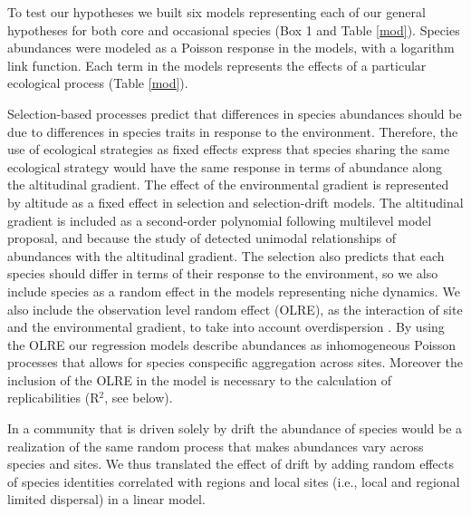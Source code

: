 \documentclass[12pt]{article}
\begin{document}
To test our hypotheses we built six models representing each of our
general hypotheses for both core and occasional species (Box 1 and
Table \ref{mod}). Species abundances were modeled as a Poisson
response in the models, %
with a logarithm link function.  Each term in the models
represents
the effects of %
a particular %
ecological process (Table \ref{mod}).

Selection-based processes predict that differences in species abundances should be
due to differences in species traits in response to the
environment. Therefore, the use of ecological strategies as fixed
effects %
express that species sharing the same ecological strategy would have
the same %
response in terms of abundance along the altitudinal gradient. The
effect of the environmental gradient is represented by altitude as a
fixed effect in selection and selection-drift models. The altitudinal
gradient is included as a second-order polynomial following
\cite{Jamil2013a, Jamil2013} multilevel model proposal, and because
the study of \cite{Paciencia2008} detected unimodal relationships of
abundances with the altitudinal gradient. The selection also predicts that
each species should differ in terms of their response to the
environment, so we also include species as a random effect in the
models representing niche dynamics.
We also include the observation
level random effect (OLRE), as the interaction of site
and the
environmental gradient, to take into account overdispersion
\citep{Bolker2009}.  By using the OLRE our regression models describe
abundances as inhomogeneous Poisson processes that allows for species
conspecific aggregation
across sites. %
Moreover the inclusion of the OLRE in the
model is necessary to the calculation of replicabilities (R{$^2$}, see
below).

In a community that is driven solely by drift the abundance of species would
be a realization of the same random process that makes abundances vary
across species and sites. We thus translated the effect of drift by adding
random effects of species identities correlated with
regions and local
sites (i.e., local and regional limited dispersal) in a linear
model. %
\end{document}
